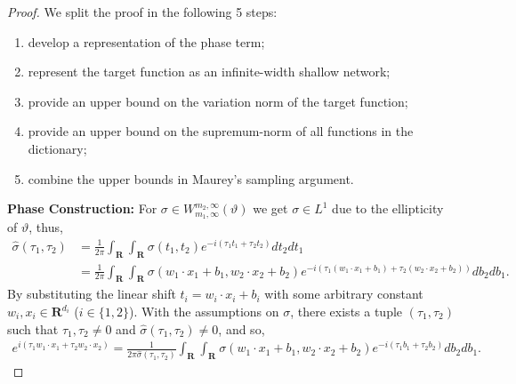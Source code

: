 \documentclass[a4paper]{article}
\newcommand{\rr}[1]{\mathbf{R}^{#1}}
\numberwithin{equation}{section}
\theoremstyle{remark}
\begin{document}
\begin{proof}
    We split the proof in the following 5 steps:
    \begin{enumerate}
        \item develop a representation of the phase term;
        \item represent the target function as an infinite-width shallow network;
        \item provide an upper bound on the variation norm of the target function;
        \item provide an upper bound on the supremum-norm of all functions in the dictionary;
        \item combine the upper bounds in Maurey's sampling argument.
    \end{enumerate}
    \textbf{Phase Construction:}
    For $\sigma\in W_{m_1,\infty}^{m_2,\infty}(\vartheta)$ we get $\sigma\in L^1$
    due to the ellipticity of $\vartheta$, thus,
    \begin{align*}
        \hat{\sigma}(\tau_1,\tau_2)
        &=\frac{1}{2\pi}\int_{\rr{}}
        \int_{\rr{}}\sigma(t_1,t_2)
        e^{-i(\tau_1t_1+\tau_2t_2)}d t_2 d t_1\\
        &=\frac{1}{2\pi}
        \int_{\rr{}}\int_{\rr{}}\sigma(w_1\cdot x_1+b_1,w_2\cdot x_2+b_2)
        e^{-i(\tau_1(w_1\cdot x_1+b_1)
             +\tau_2(w_2\cdot x_2+b_2))}
        d b_2 d b_1.
    \end{align*}
    By substituting the linear shift $t_i=w_i\cdot x_i + b_i$
    with some arbitrary constant $w_i,x_i\in\rr{d_i}$ ($i\in\{1,2\}$).
    With the assumptions on $\sigma$,
    there exists a tuple $(\tau_1,\tau_2)$
    such that $\tau_1,\tau_2\neq 0$ and $\hat{\sigma}(\tau_1,\tau_2)\neq0$,
    and so,
    \begin{align*}
        e^{i(\tau_1w_1\cdot x_1+\tau_2w_2\cdot x_2)}
        =\frac{1}{2\pi\hat{\sigma}(\tau_1,\tau_2)}
        \int_{\rr{}}\int_{\rr{}}\sigma(w_1\cdot x_1+b_1,w_2\cdot x_2+b_2)
        e^{-i(\tau_1b_1
             +\tau_2b_2)}
        d b_2 d b_1.
    \end{align*}


\end{proof}
\end{document}

